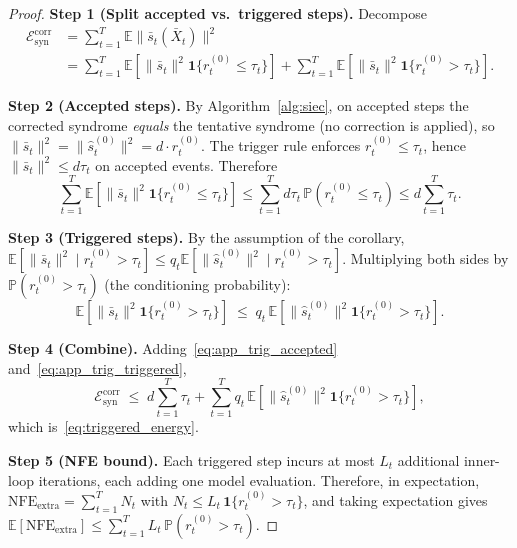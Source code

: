 \documentclass{article}
\theoremstyle{plain}
\theoremstyle{definition}
\theoremstyle{remark}
\begin{document}
\begin{proof}
\textbf{Step 1 (Split accepted vs.\ triggered steps).}
Decompose
\begin{align*}
\mathcal{E}^{\mathrm{corr}}_{\mathrm{syn}}
&= \sum_{t=1}^T \mathbb{E}\|\bar s_t(\bar X_t)\|^2 \\
&= \sum_{t=1}^T \mathbb{E}\!\left[\|\bar s_t\|^2 \mathbf{1}\{r_t^{(0)}\le\tau_t\}\right]
 + \sum_{t=1}^T \mathbb{E}\!\left[\|\bar s_t\|^2 \mathbf{1}\{r_t^{(0)}>\tau_t\}\right].
\end{align*}

\textbf{Step 2 (Accepted steps).}
By Algorithm~\ref{alg:siec}, on accepted steps the corrected syndrome
\emph{equals} the tentative syndrome (no correction is applied), so
\(\|\bar s_t\|^2 = \|\hat s_t^{(0)}\|^2 = d\cdot r_t^{(0)}\). The trigger
rule enforces \(r_t^{(0)} \le \tau_t\), hence
\(\|\bar s_t\|^2 \le d\tau_t\) on accepted events. Therefore
\begin{equation}
\sum_{t=1}^T \mathbb{E}\!\left[\|\bar s_t\|^2 \mathbf{1}\{r_t^{(0)}\le\tau_t\}\right]
\le \sum_{t=1}^T d\tau_t\,\mathbb{P}(r_t^{(0)}\le\tau_t)
\le d\sum_{t=1}^T \tau_t.
\label{eq:app_trig_accepted}
\end{equation}

\textbf{Step 3 (Triggered steps).}
By the assumption of the corollary,
\(\mathbb{E}[\|\bar s_t\|^2 \mid r_t^{(0)}>\tau_t] \le q_t \mathbb{E}[\|\hat
s_t^{(0)}\|^2 \mid r_t^{(0)}>\tau_t]\). Multiplying both sides by
\(\mathbb{P}(r_t^{(0)}>\tau_t)\) (the conditioning probability):
\begin{equation}
\mathbb{E}\!\left[\|\bar s_t\|^2\mathbf{1}\{r_t^{(0)}>\tau_t\}\right]
\;\le\; q_t\,\mathbb{E}\!\left[\|\hat s_t^{(0)}\|^2\mathbf{1}\{r_t^{(0)}>\tau_t\}\right].
\label{eq:app_trig_triggered}
\end{equation}

\textbf{Step 4 (Combine).}
Adding~\eqref{eq:app_trig_accepted}
and~\eqref{eq:app_trig_triggered},
\begin{equation}
\mathcal{E}^{\mathrm{corr}}_{\mathrm{syn}}
\;\le\; d\sum_{t=1}^T\tau_t
+ \sum_{t=1}^T q_t\,\mathbb{E}\!\left[\|\hat s_t^{(0)}\|^2\mathbf{1}\{r_t^{(0)}>\tau_t\}\right],
\label{eq:app_trig_energy}
\end{equation}
which is~\eqref{eq:triggered_energy}.

\textbf{Step 5 (NFE bound).}
Each triggered step incurs at most \(L_t\) additional inner-loop iterations,
each adding one model evaluation. Therefore, in expectation,
\(\mathrm{NFE}_{\mathrm{extra}} = \sum_{t=1}^T N_t\) with
\(N_t \le L_t\,\mathbf{1}\{r_t^{(0)}>\tau_t\}\), and taking expectation
gives \(\mathbb{E}[\mathrm{NFE}_{\mathrm{extra}}]
\le \sum_{t=1}^T L_t\,\mathbb{P}(r_t^{(0)}>\tau_t)\).
\end{proof}
\end{document}

